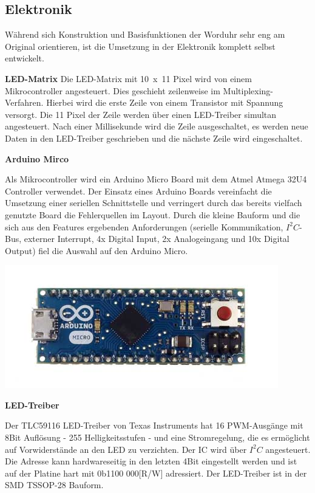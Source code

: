 \begin{multicols}{2}
\section{Elektronik}
\label{sec:Elektronik}
Während sich Konstruktion und Basisfunktionen der Worduhr sehr eng am Original orientieren, ist die Umsetzung in der Elektronik komplett selbst entwickelt.

\textbf{LED-Matrix} Die LED-Matrix mit 10~x~11 Pixel wird von einem Mikrocontroller angesteuert. Dies geschieht zeilenweise im Multiplexing-Verfahren. Hierbei wird die erste Zeile von einem Transistor mit Spannung versorgt. Die 11 Pixel der Zeile werden über einen LED-Treiber simultan angesteuert. Nach einer Millisekunde wird die Zeile ausgeschaltet, es werden neue Daten in den LED-Treiber geschrieben und die nächste Zeile wird eingeschaltet. 

\textbf{Arduino Mirco}

Als Mikrocontroller wird ein Arduino Micro Board mit dem Atmel Atmega 32U4 Controller verwendet. Der Einsatz eines Arduino Boards vereinfacht die Umsetzung einer seriellen Schnittstelle und verringert durch das bereits vielfach genutzte Board die Fehlerquellen im Layout. Durch die kleine Bauform und die sich aus den Features ergebenden Anforderungen (serielle Kommunikation, $I^{2}C$-Bus, externer Interrupt, 4x Digital Input, 2x Analogeingang und 10x Digital Output) fiel die Auswahl auf den Arduino Micro.

\includegraphics[width=\columnwidth]{Abbildungen/Elektronik/ArduinoMicro}

\textbf{LED-Treiber}

Der TLC59116 LED-Treiber von Texas Instruments hat 16 PWM-Ausgänge mit 8Bit Auflösung - 255 Helligkeitsstufen - und eine Stromregelung, die es ermöglicht auf Vorwiderstände an den LED zu verzichten. Der IC wird über $I^{2}C$ angesteuert. Die Adresse kann hardwareseitig in den letzten 4Bit eingestellt werden und ist auf der Platine hart mit 0b1100 000[R/W] adressiert. Der LED-Treiber ist in der SMD TSSOP-28 Bauform.


\end{multicols}
